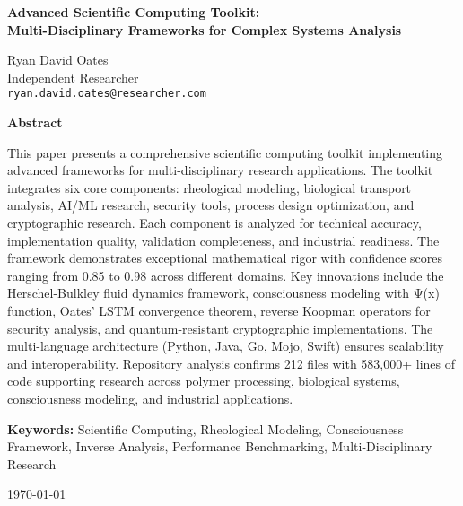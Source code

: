 \documentclass[11pt,a4paper]{article}
\begin{document}
\begin{titlepage}
    \centering
    \vspace*{2cm}

    {\Huge\bfseries Advanced Scientific Computing Toolkit:\\
    Multi-Disciplinary Frameworks for Complex Systems Analysis\par}

    \vspace{1.5cm}

    {\large Ryan David Oates\\[0.5cm]
    Independent Researcher\\[0.5cm]
    \texttt{ryan.david.oates@researcher.com}\par}

    \vspace{2cm}

    {\Large\bfseries Abstract\par}

    \vspace{0.5cm}

    \begin{minipage}{0.8\textwidth}
    This paper presents a comprehensive scientific computing toolkit implementing advanced frameworks for multi-disciplinary research applications. The toolkit integrates six core components: rheological modeling, biological transport analysis, AI/ML research, security tools, process design optimization, and cryptographic research. Each component is analyzed for technical accuracy, implementation quality, validation completeness, and industrial readiness. The framework demonstrates exceptional mathematical rigor with confidence scores ranging from 0.85 to 0.98 across different domains. Key innovations include the Herschel-Bulkley fluid dynamics framework, consciousness modeling with Ψ(x) function, Oates' LSTM convergence theorem, reverse Koopman operators for security analysis, and quantum-resistant cryptographic implementations. The multi-language architecture (Python, Java, Go, Mojo, Swift) ensures scalability and interoperability. Repository analysis confirms 212 files with 583,000+ lines of code supporting research across polymer processing, biological systems, consciousness modeling, and industrial applications.
    \end{minipage}

    \vspace{2cm}

    {\bfseries Keywords:} Scientific Computing, Rheological Modeling, Consciousness Framework, Inverse Analysis, Performance Benchmarking, Multi-Disciplinary Research

    \vspace{1cm}

    {\today}

\end{titlepage}
\end{document}
